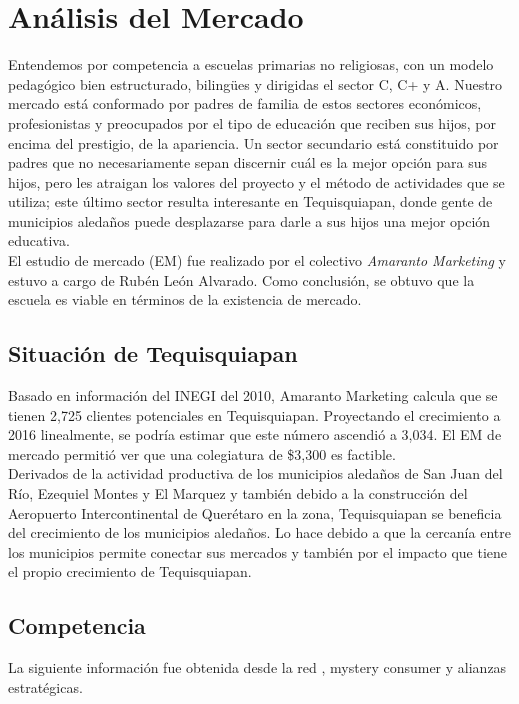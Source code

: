\documentclass[10pt,letterpaper,oneside]{book}
\begin{document}
\section{Análisis del Mercado}

Entendemos por competencia a escuelas primarias no religiosas, con un modelo pedagógico bien estructurado, bilingües y dirigidas el sector C, C+ y A. Nuestro mercado está conformado por padres de familia de estos sectores económicos, profesionistas y preocupados por el tipo de educación que reciben sus hijos, por encima del prestigio, de la apariencia. Un sector secundario está constituido por padres que no necesariamente sepan discernir cuál es la mejor opción para sus hijos, pero les atraigan los valores del proyecto y el método de actividades que se utiliza; este último sector resulta interesante en Tequisquiapan, donde gente de municipios aledaños puede desplazarse para darle a sus hijos una mejor opción educativa.\\
El estudio de mercado (EM) fue realizado por el colectivo \emph{Amaranto Marketing} y estuvo a cargo de Rubén León Alvarado. Como conclusión, se obtuvo que la escuela es viable en términos de la existencia de mercado.

\subsection{Situación de Tequisquiapan}

Basado en información del INEGI del 2010, Amaranto Marketing calcula que se tienen 2,725 clientes potenciales en Tequisquiapan. Proyectando el crecimiento a 2016 linealmente, se podría estimar que este número ascendió a 3,034. El EM de mercado permitió ver que una colegiatura de \$3,300 es factible.\\
Derivados de la actividad productiva de los municipios aledaños de San Juan del Río, Ezequiel Montes y El Marquez y también debido a la construcción del Aeropuerto Intercontinental de Querétaro en la zona, Tequisquiapan se beneficia del crecimiento de los municipios aledaños. Lo hace debido a que la cercanía entre los municipios permite conectar sus mercados y también por el impacto que tiene el propio crecimiento de Tequisquiapan.

\subsection{Competencia}

La siguiente información fue obtenida desde la red \cite{mejoresescuelas}, mystery consumer y alianzas estratégicas.
\end{document}
